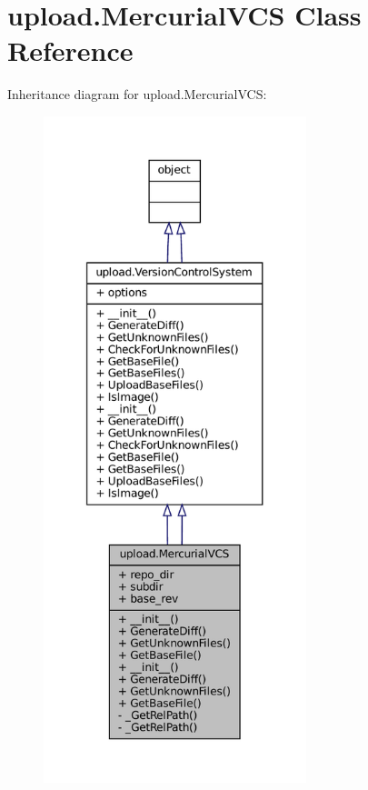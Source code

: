 \hypertarget{classupload_1_1MercurialVCS}{}\section{upload.\+Mercurial\+V\+CS Class Reference}
\label{classupload_1_1MercurialVCS}


Inheritance diagram for upload.\+Mercurial\+V\+CS\+:
\nopagebreak
\begin{figure}[H]
\begin{center}
\leavevmode
\includegraphics[height=550pt]{classupload_1_1MercurialVCS__inherit__graph}
\end{center}
\end{figure}


